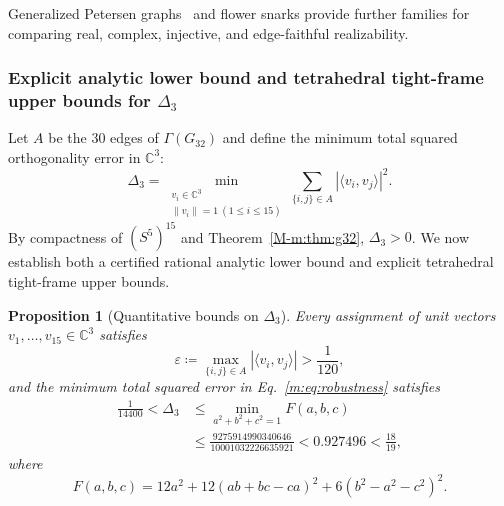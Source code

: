 \documentclass[aps,pra,reprint,superscriptaddress,longbibliography,nofootinbib,floatfix,10pt]{revtex4-2}
\newtheorem{proposition}[theorem]{Proposition}
\theoremstyle{definition}
\newcommand{\C}{\mathbb{C}}
\begin{document}
Generalized Petersen graphs~\cite{schrag1988petersen} and flower snarks provide
further families for comparing real, complex, injective, and edge-faithful
realizability.

\subsubsection{Explicit analytic lower bound and tetrahedral tight-frame upper bounds for \texorpdfstring{$\Delta_3$}{Delta3}}

Let $A$ be the 30 edges of $\Gamma(G_{32})$ and define the minimum total squared
orthogonality error in $\C^3$:
\begin{equation}\label{m:eq:robustness}
\Delta_3=\min_{\substack{v_i\in\C^3\\\|v_i\|=1\ (1\le i\le15)}}
       \sum_{\{i,j\}\in A}|\langle v_i,v_j\rangle|^2.
\end{equation}
By compactness of $(S^5)^{15}$ and Theorem~\ref{M-m:thm:g32}, $\Delta_3>0$. We now
establish both a certified rational analytic lower bound and explicit
tetrahedral tight-frame upper bounds.

\begin{proposition}[Quantitative bounds on $\Delta_3$]\label{m:prop:robustness}
Every assignment of unit vectors $v_1,\ldots,v_{15}\in\C^3$ satisfies
\begin{equation}\label{m:eq:epsilon-bound}
\varepsilon \coloneqq \max_{\{i,j\}\in A}|\langle v_i,v_j\rangle| > \frac{1}{120},
\end{equation}
and the minimum total squared error in Eq.~\eqref{m:eq:robustness} satisfies
\begin{align}
\frac{1}{14400} < \Delta_3 &\le \min_{a^2+b^2+c^2=1} F(a,b,c) \nonumber\\
&\le \frac{9275914990340646}{10001032226635921} < 0.927496 < \frac{18}{19},
\label{m:eq:delta3-bounds}
\end{align}
where
\begin{equation}\label{m:eq:tetrahedral-poly}
F(a,b,c) = 12a^2 + 12(ab+bc-ca)^2 + 6(b^2-a^2-c^2)^2.
\end{equation}
\end{proposition}
\end{document}
